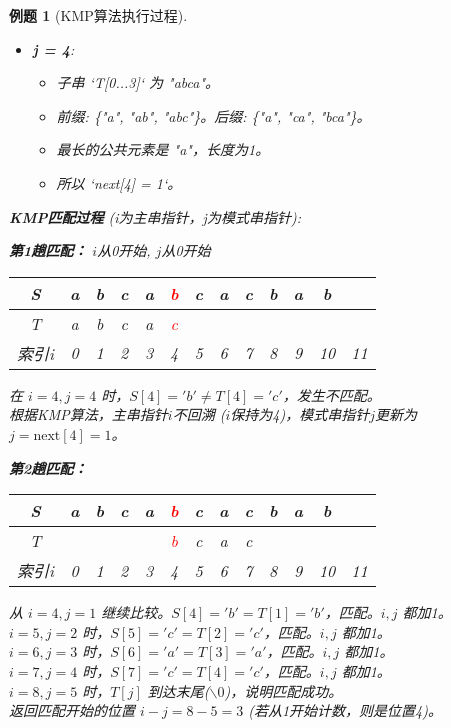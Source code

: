 \documentclass[12pt,a4paper]{amsart}
\newtheorem{example}{例题}[section]
\begin{document}
\begin{example}[KMP算法执行过程]
\begin{itemize}
\begin{itemize}
            \item 所以 `next[3] = 0`。
        \end{itemize}
    \item \textbf{j = 4}: 
        \begin{itemize}
            \item 子串 `T[0...3]` 为 "abca"。
            \item 前缀: \{"a", "ab", "abc"\}。后缀: \{"a", "ca", "bca"\}。
            \item 最长的公共元素是 "a"，长度为1。
            \item 所以 `next[4] = 1`。
        \end{itemize}
\end{itemize}

\textbf{KMP匹配过程} (i为主串指针，j为模式串指针):

\textbf{第1趟匹配：} $i$从0开始, $j$从0开始
\begin{center}
\begin{tabular}{|c|c|c|c|c|c|c|c|c|c|c|c|c|}
\hline
S & a & b & c & a & \textcolor{red}{b} & c & a & c & b & a & b & \\
\hline
T & a & b & c & a & \textcolor{red}{c} &  &  &  &  &  &  &  \\
\hline
索引i & 0 & 1 & 2 & 3 & 4 & 5 & 6 & 7 & 8 & 9 & 10 & 11 \\
\hline
\end{tabular}
\end{center}
在 $i=4, j=4$ 时，$S[4]='b' \neq T[4]='c'$，发生不匹配。\\
根据KMP算法，主串指针$i$不回溯 ($i$保持为4)，模式串指针$j$更新为 $j = \text{next}[4] = 1$。

\textbf{第2趟匹配：}
\begin{center}
\begin{tabular}{|c|c|c|c|c|c|c|c|c|c|c|c|c|}
\hline
S & a & b & c & a & \textcolor{red}{b} & c & a & c & b & a & b & \\
\hline
T &   &   &   &   & \textcolor{red}{b} & c & a & c &  &  &  &  \\
\hline
索引i & 0 & 1 & 2 & 3 & 4 & 5 & 6 & 7 & 8 & 9 & 10 & 11 \\
\hline
\end{tabular}
\end{center}
从 $i=4, j=1$ 继续比较。$S[4]='b' = T[1]='b'$，匹配。$i,j$ 都加1。\\
$i=5, j=2$ 时，$S[5]='c' = T[2]='c'$，匹配。$i,j$ 都加1。\\
$i=6, j=3$ 时，$S[6]='a' = T[3]='a'$，匹配。$i,j$ 都加1。\\
$i=7, j=4$ 时，$S[7]='c' = T[4]='c'$，匹配。$i,j$ 都加1。\\
$i=8, j=5$ 时，$T[j]$ 到达末尾($\backslash 0$)，说明匹配成功。\\
返回匹配开始的位置 $i-j = 8-5 = 3$ (若从1开始计数，则是位置4)。
\end{example}
\end{document}
